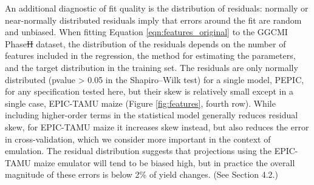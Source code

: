\documentclass[gmdd]{copernicus} %
\providecommand{\DIFadd}[1]{{\protect\color{blue}\uwave{#1}}} %
\providecommand{\DIFdel}[1]{{\protect\color{red}\sout{#1}}}                      %
\providecommand{\DIFaddbegin}{} %
\providecommand{\DIFaddend}{} %
\providecommand{\DIFdelbegin}{} %
\providecommand{\DIFdelend}{} %
\begin{document}
An additional diagnostic of fit quality is the distribution of residuals: normally or near-normally distributed residuals imply that errors around the fit are random and unbiased. 
When fitting Equation \ref{eqn:features_original} to the GGCMI Phase\DIFdelbegin \DIFdel{II }\DIFdelend \DIFaddbegin \DIFadd{~2 }\DIFaddend dataset, the distribution of the residuals depends on the number of features included in the regression, the method for estimating the parameters, and the target distribution in the training set. The residuals are only normally distributed (pvalue > 0.05 in the Shapiro–Wilk test) for a single model, PEPIC, for any specification tested here, but their skew is relatively small except in a single case, EPIC-TAMU maize (Figure \ref{fig:features}, fourth row).
While including higher-order terms in the statistical model generally reduces residual skew, for EPIC-TAMU maize it increases skew instead, but also reduces the error in cross-validation, which we consider more important in the context of emulation.
The residual distribution suggests that projections using the EPIC-TAMU maize emulator will tend to be biased high, but in practice the overall magnitude of these errors is below 2\% of yield changes. (See Section 4.2.)

\end{document}

